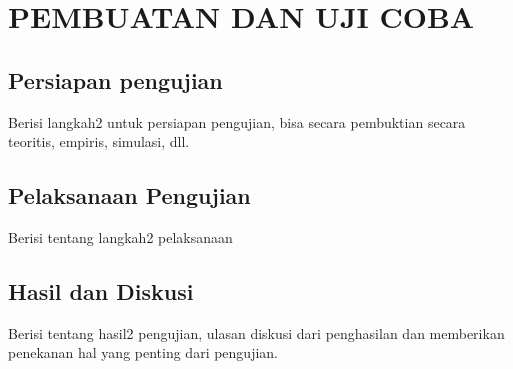 
\chapter{PEMBUATAN DAN UJI COBA}
\label{cha:4-PembuatanDanUjiCoba}

\section{Persiapan pengujian}
\label{sec:4-PersiapanPengujian}

Berisi langkah2 untuk persiapan pengujian, bisa secara pembuktian secara teoritis, empiris, simulasi, dll.

\section{Pelaksanaan Pengujian}
\label{sec:4-PelaksanaanPengujian}

Berisi tentang langkah2 pelaksanaan

\section{Hasil dan Diskusi}
\label{sec:4-HasilDiskusi}

Berisi tentang hasil2 pengujian, ulasan diskusi dari penghasilan dan memberikan penekanan hal yang penting dari pengujian.
